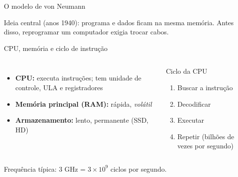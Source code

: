 \documentclass[aspectratio=169,10pt,t]{beamer}
\begin{document}
\begin{frame}{O modelo de von Neumann}
  \begin{center}
  \end{center}
  \vspace{-1ex}
  \small Ideia central (anos 1940): \alert{programa e dados ficam na mesma memória}. Antes disso, reprogramar um computador exigia trocar cabos.
\end{frame}

\begin{frame}{CPU, memória e ciclo de instrução}
  \begin{columns}[T]
    \begin{itemize}
      \item \textbf{CPU:} executa instruções; tem unidade de controle, ULA e registradores
      \item \textbf{Memória principal (RAM):} rápida, \emph{volátil}
      \item \textbf{Armazenamento:} lento, permanente (SSD, HD)
    \end{itemize}
    \begin{block}{Ciclo da CPU}
      \begin{enumerate}\small
        \item Buscar a instrução
        \item Decodificar
        \item Executar
        \item Repetir (bilhões de vezes por segundo)
      \end{enumerate}
    \end{block}
  \end{columns}
  \vspace{1ex}
  Frequência típica: 3 GHz = \(3\times10^9\) ciclos por segundo.
\end{frame}
\end{document}
